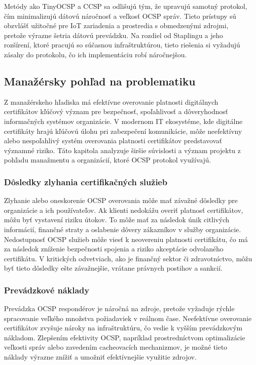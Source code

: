 \documentclass[12pt, twoside]{book}
\begin{document}
Metódy ako TinyOCSP a CCSP sa odlišujú tým, že upravujú samotný protokol, čím minimalizujú dátovú náročnosť a veľkosť OCSP správ. Tieto prístupy sú obzvlášť užitočné pre IoT zariadenia a prostredia s obmedzenými zdrojmi, pretože výrazne šetria dátovú prevádzku. Na rozdiel od Staplingu a jeho rozšírení, ktoré pracujú so súčasnou infraštruktúrou, tieto riešenia si vyžadujú zásahy do protokolu, čo ich implementáciu robí náročnejšou.



\subsection{Manažérsky pohľad na problematiku}
Z manažérskeho hľadiska má efektívne overovanie platnosti digitálnych certifikátov kľúčový význam pre bezpečnosť, spoľahlivosť a dôveryhodnosť informačných systémov organizácie. V modernom IT ekosystéme, kde digitálne certifikáty hrajú kľúčovú úlohu pri zabezpečení komunikácie, môže neefektívny alebo nespoľahlivý systém overovania platnosti certifikátov predstavovať významné riziko. Táto kapitola analyzuje širšie súvislosti a význam projektu z pohľadu manažmentu a organizácií, ktoré OCSP protokol využívajú.

\subsubsection{Dôsledky zlyhania certifikačných služieb}
Zlyhanie alebo oneskorenie OCSP overovania môže mať závažné dôsledky pre organizácie a ich používateľov. Ak klienti nedokážu overiť platnosť certifikátov, môžu byť vystavení riziku útokov. To môže mať za následok únik citlivých informácií, finančné straty a oslabenie dôvery zákazníkov v služby organizácie. Nedostupnosť OCSP služieb môže viesť k neovereniu platnosti certifikátu, čo má za následok zníženie bezpečnosti spojenia a riziko akceptácie odvolaného certifikátu. V kritických odvetviach, ako je finančný sektor či zdravotníctvo, môžu byť tieto dôsledky ešte závažnejšie, vrátane právnych postihov a sankcií.

\subsubsection{Prevádzkové náklady}
Prevádzka OCSP respondérov je náročná na zdroje, pretože vyžaduje rýchle spracovanie veľkého množstva požiadaviek v reálnom čase. Neefektívne overovanie certifikátov zvyšuje nároky na infraštruktúru, čo vedie k vyšším prevádzkovým nákladom. Zlepšením efektivity OCSP, napríklad prostredníctvom optimalizácie veľkosti správ alebo zavedením cacheovacích mechanizmov, je možné tieto náklady výrazne znížiť a umožniť efektívnejšie využitie zdrojov.
\end{document}
